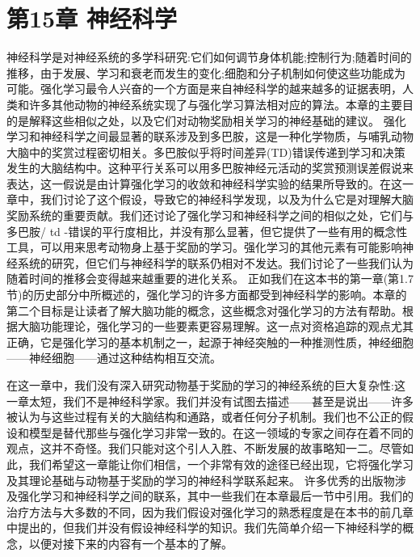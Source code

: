 \chapter{第15章 神经科学}

\begin{summary}
	
	神经科学是对神经系统的多学科研究:它们如何调节身体机能;控制行为;随着时间的推移，由于发展、学习和衰老而发生的变化;细胞和分子机制如何使这些功能成为可能。强化学习最令人兴奋的一个方面是来自神经科学的越来越多的证据表明，人类和许多其他动物的神经系统实现了与强化学习算法相对应的算法。本章的主要目的是解释这些相似之处，以及它们对动物奖励相关学习的神经基础的建议。
	强化学习和神经科学之间最显著的联系涉及到多巴胺，这是一种化学物质，与哺乳动物大脑中的奖赏过程密切相关。多巴胺似乎将时间差异(TD)错误传递到学习和决策发生的大脑结构中。这种平行关系可以用多巴胺神经元活动的奖赏预测误差假说来表达，这一假说是由计算强化学习的收敛和神经科学实验的结果所导致的。在这一章中，我们讨论了这个假设，导致它的神经科学发现，以及为什么它是对理解大脑奖励系统的重要贡献。我们还讨论了强化学习和神经科学之间的相似之处，它们与多巴胺/ td -错误的平行度相比，并没有那么显著，但它提供了一些有用的概念性工具，可以用来思考动物身上基于奖励的学习。强化学习的其他元素有可能影响神经系统的研究，但它们与神经科学的联系仍相对不发达。我们讨论了一些我们认为随着时间的推移会变得越来越重要的进化关系。
	正如我们在这本书的第一章(第1.7节)的历史部分中所概述的，强化学习的许多方面都受到神经科学的影响。本章的第二个目标是让读者了解大脑功能的概念，这些概念对强化学习的方法有帮助。根据大脑功能理论，强化学习的一些要素更容易理解。这一点对资格追踪的观点尤其正确，它是强化学习的基本机制之一，起源于神经突触的一种推测性质，神经细胞——神经细胞——通过这种结构相互交流。
	
	在这一章中，我们没有深入研究动物基于奖励的学习的神经系统的巨大复杂性:这一章太短，我们不是神经科学家。我们并没有试图去描述——甚至是说出——许多被认为与这些过程有关的大脑结构和通路，或者任何分子机制。我们也不公正的假设和模型是替代那些与强化学习非常一致的。在这一领域的专家之间存在着不同的观点，这并不奇怪。我们只能对这个引人入胜、不断发展的故事略知一二。尽管如此，我们希望这一章能让你们相信，一个非常有效的途径已经出现，它将强化学习及其理论基础与动物基于奖励的学习的神经科学联系起来。
	许多优秀的出版物涉及强化学习和神经科学之间的联系，其中一些我们在本章最后一节中引用。我们的治疗方法与大多数的不同，因为我们假设对强化学习的熟悉程度是在本书的前几章中提出的，但我们并没有假设神经科学的知识。我们先简单介绍一下神经科学的概念，以便对接下来的内容有一个基本的了解。
		
\end{summary}

